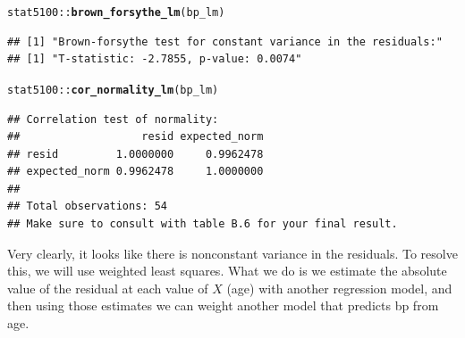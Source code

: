 \documentclass{article}\usepackage[]{graphicx}\usepackage[]{color}
\makeatletter
\newcommand{\hlopt}[1]{\textcolor[rgb]{0,0,0}{#1}}%
\newcommand{\hlstd}[1]{\textcolor[rgb]{0.345,0.345,0.345}{#1}}%
\newcommand{\hlkwd}[1]{\textcolor[rgb]{0.737,0.353,0.396}{\textbf{#1}}}%
\newenvironment{kframe}{%
 \def\at@end@of@kframe{}%
 \ifinner\ifhmode%
  \def\at@end@of@kframe{\end{minipage}}%
  \begin{minipage}{\columnwidth}%
 \fi\fi%
 \def\FrameCommand##1{\hskip\@totalleftmargin \hskip-\fboxsep
 \colorbox{shadecolor}{##1}\hskip-\fboxsep
     \hskip-\linewidth \hskip-\@totalleftmargin \hskip\columnwidth}%
 \MakeFramed {\advance\hsize-\width
   \@totalleftmargin\z@ \linewidth\hsize
   \@setminipage}}%
 {\par\unskip\endMakeFramed%
 \at@end@of@kframe}
\newenvironment{knitrout}{}{} %
\makeatother
\begin{document}
\begin{knitrout}
\color{fgcolor}\begin{kframe}
\begin{alltt}
\hlstd{stat5100}\hlopt{::}\hlkwd{brown_forsythe_lm}\hlstd{(bp_lm)}
\end{alltt}
\begin{verbatim}
## [1] "Brown-forsythe test for constant variance in the residuals:"
## [1] "T-statistic: -2.7855, p-value: 0.0074"
\end{verbatim}
\begin{alltt}
\hlstd{stat5100}\hlopt{::}\hlkwd{cor_normality_lm}\hlstd{(bp_lm)}
\end{alltt}
\begin{verbatim}
## Correlation test of normality:
##                   resid expected_norm
## resid         1.0000000     0.9962478
## expected_norm 0.9962478     1.0000000
## 
## Total observations: 54
## Make sure to consult with table B.6 for your final result.
\end{verbatim}
\end{kframe}
\end{knitrout}

Very clearly, it looks like there is nonconstant variance in the residuals. To resolve this, we will use weighted least squares. What we do is we estimate the absolute value of the residual at each value of $X$ (age) with another regression model, and then using those estimates we can weight another model that predicts bp from age.
\end{document}
